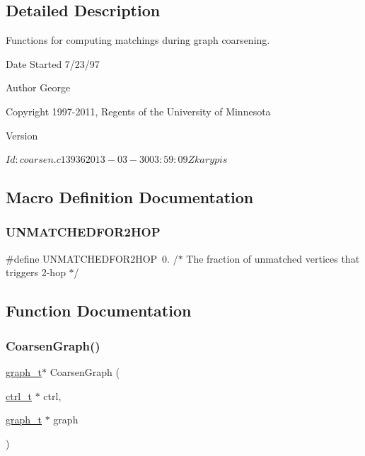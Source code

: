 \subsection{Detailed Description}
Functions for computing matchings during graph coarsening. 

\begin{DoxyDate}{Date}
Started 7/23/97 
\end{DoxyDate}
\begin{DoxyAuthor}{Author}
George 

Copyright 1997-\/2011, Regents of the University of Minnesota 
\end{DoxyAuthor}
\begin{DoxyVersion}{Version}
\begin{DoxyVerb}$Id: coarsen.c 13936 2013-03-30 03:59:09Z karypis $ \end{DoxyVerb}
 
\end{DoxyVersion}


\subsection{Macro Definition Documentation}
\mbox{\label{a00182_ad49dc6effe759748c2065146d166c742}} 
\subsubsection{\texorpdfstring{U\+N\+M\+A\+T\+C\+H\+E\+D\+F\+O\+R2\+H\+OP}{UNMATCHEDFOR2HOP}}
{\footnotesize\ttfamily \#define U\+N\+M\+A\+T\+C\+H\+E\+D\+F\+O\+R2\+H\+OP~0.  /$\ast$ The fraction of unmatched vertices that triggers 2-\/hop $\ast$/}



\subsection{Function Documentation}
\mbox{\label{a00182_adeb2c7c9bffbeca00fcc97854fb88ada}} 
\subsubsection{\texorpdfstring{Coarsen\+Graph()}{CoarsenGraph()}}
{\footnotesize\ttfamily \hyperlink{a00734}{graph\+\_\+t}$\ast$ Coarsen\+Graph (\begin{DoxyParamCaption}\item[{\hyperlink{a00742}{ctrl\+\_\+t} $\ast$}]{ctrl,  }\item[{\hyperlink{a00734}{graph\+\_\+t} $\ast$}]{graph }\end{DoxyParamCaption})}

